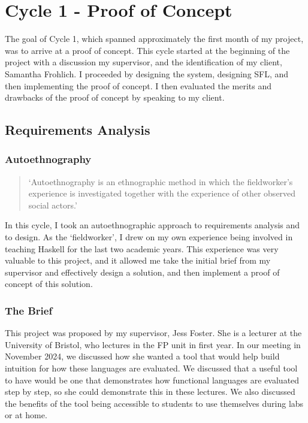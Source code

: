 \chapter{Cycle 1 - Proof of Concept}
The goal of Cycle 1, which spanned approximately the first month of my project, was to arrive at a proof of concept. This cycle started at the beginning of the project with a discussion my supervisor, and the identification of my client, Samantha Frohlich. I proceeded by designing the system, designing \ac{SFL}, and then implementing the proof of concept. I then evaluated the merits and drawbacks of the proof of concept by speaking to my client. 



\section{Requirements Analysis}
\subsection{Autoethnography}
\label{sec:c1_autoethnography}
\begin{quote}
`Autoethnography is an ethnographic method in which the fieldworker’s experience is investigated together with the experience of other observed social actors.'\cite{autoethnography}
\end{quote}

\noindent In this cycle, I took an autoethnographic approach to requirements analysis and to design. As the `fieldworker', I drew on my own experience being involved in teaching Haskell for the last two academic years. This experience was very valuable to this project, and it allowed me take the initial brief from my supervisor and effectively design a solution, and then implement a proof of concept of this solution. 

\subsection{The Brief}
This project was proposed by my supervisor, Jess Foster. She is a lecturer at the University of Bristol, who lectures in the \ac{FP} unit in first year. In our meeting in November 2024, we discussed how she wanted a tool that would help build intuition for how these languages are evaluated. We discussed that a useful tool to have would be one that demonstrates how functional languages are evaluated step by step, so she could demonstrate this in these lectures. We also discussed the benefits of the tool being accessible to students to use themselves during labs or at home. 

